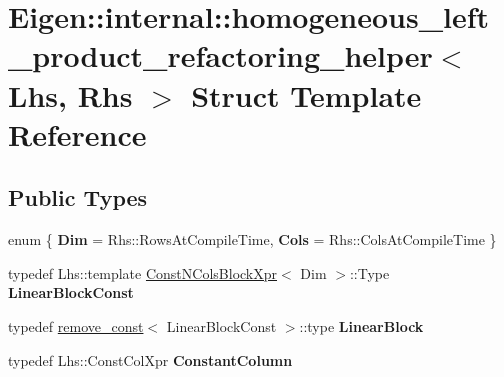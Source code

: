 \hypertarget{struct_eigen_1_1internal_1_1homogeneous__left__product__refactoring__helper}{}\section{Eigen\+::internal\+::homogeneous\+\_\+left\+\_\+product\+\_\+refactoring\+\_\+helper$<$ Lhs, Rhs $>$ Struct Template Reference}
\label{struct_eigen_1_1internal_1_1homogeneous__left__product__refactoring__helper}
\subsection*{Public Types}
\begin{DoxyCompactItemize}
\item 
\mbox{\label{struct_eigen_1_1internal_1_1homogeneous__left__product__refactoring__helper_af35c412d3f93cf23aa5a2aaeeb6ca4f6}} 
enum \{ {\bfseries Dim} = Rhs\+::Rows\+At\+Compile\+Time, 
{\bfseries Cols} = Rhs\+::Cols\+At\+Compile\+Time
 \}
\item 
\mbox{\label{struct_eigen_1_1internal_1_1homogeneous__left__product__refactoring__helper_aeb99389a9a8f596582e850af9e89317e}} 
typedef Lhs\+::template \mbox{\hyperlink{struct_const_n_cols_block_xpr}{Const\+N\+Cols\+Block\+Xpr}}$<$ Dim $>$\+::Type {\bfseries Linear\+Block\+Const}
\item 
\mbox{\label{struct_eigen_1_1internal_1_1homogeneous__left__product__refactoring__helper_a2f2a81d423781aa7487596fa72037117}} 
typedef \mbox{\hyperlink{struct_eigen_1_1internal_1_1remove__const}{remove\+\_\+const}}$<$ Linear\+Block\+Const $>$\+::type {\bfseries Linear\+Block}
\item 
\mbox{\label{struct_eigen_1_1internal_1_1homogeneous__left__product__refactoring__helper_a8d92c5f8ff8b662f545631185ef9ca35}} 
typedef Lhs\+::\+Const\+Col\+Xpr {\bfseries Constant\+Column}
\item 

\end{DoxyCompactItemize}
